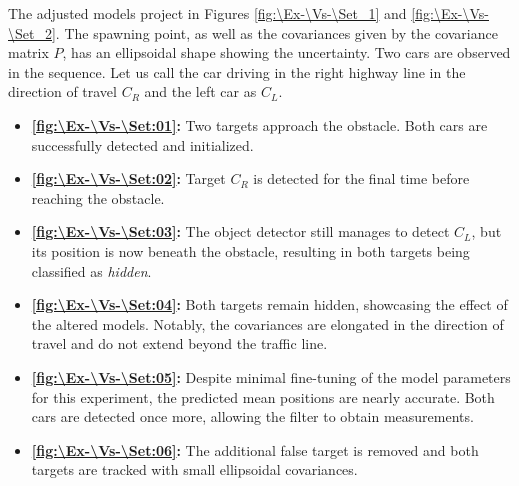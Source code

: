 The adjusted models project in Figures \ref{fig:\Ex-\Vs-\Set_1} and \ref{fig:\Ex-\Vs-\Set_2}. The spawning point, as
well as the covariances given by the covariance matrix $P$, has
an ellipsoidal shape showing the uncertainty. Two cars
are observed in the sequence. Let us call the car driving in the right highway line in the direction of travel $C_R$
and the left car as $C_L$.

\begin{itemize}
    \item \textbf{\ref{fig:\Ex-\Vs-\Set:01}:} Two targets approach the obstacle. Both cars are successfully detected and initialized.
    \item \textbf{\ref{fig:\Ex-\Vs-\Set:02}:} Target $C_R$ is detected for the final time before reaching the obstacle.
    \item \textbf{\ref{fig:\Ex-\Vs-\Set:03}:} The object detector still manages to detect $C_L$, but its position is now beneath the obstacle, resulting in both targets being classified as \textit{hidden}.
    \item \textbf{\ref{fig:\Ex-\Vs-\Set:04}:} Both targets remain hidden, showcasing the effect of the altered models. Notably, the covariances are elongated in the direction of travel and do not extend beyond the traffic line.
    \item \textbf{\ref{fig:\Ex-\Vs-\Set:05}:} Despite minimal fine-tuning of the model parameters for this experiment, the predicted mean positions are nearly accurate. Both cars are detected once more, allowing the filter to obtain measurements.
    \item \textbf{\ref{fig:\Ex-\Vs-\Set:06}:} The additional false target is removed and both targets are tracked with small ellipsoidal covariances.
\end{itemize}


